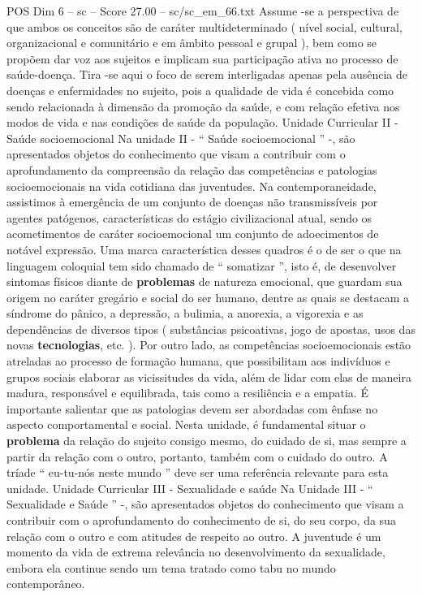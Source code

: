 \begin{textsample}{POS Dim 6 – sc – Score 27.00 – sc/sc\_em\_66.txt}
Assume -se a perspectiva de que ambos os conceitos são de caráter multideterminado ( nível social, cultural, organizacional e comunitário e em âmbito pessoal e grupal ), bem como se propõem dar voz aos sujeitos e implicam sua participação ativa no processo de saúde-doença.
Tira -se aqui o foco de serem interligadas apenas pela ausência de doenças e enfermidades no sujeito, pois a qualidade de vida é concebida como sendo relacionada à dimensão da promoção da saúde, e com relação efetiva nos modos de vida e nas condições de saúde da população.
Unidade Curricular II - Saúde socioemocional Na unidade II - “ Saúde socioemocional ” -, são apresentados objetos do conhecimento que visam a contribuir com o aprofundamento da compreensão da relação das competências e patologias socioemocionais na vida cotidiana das juventudes.
Na contemporaneidade, assistimos à emergência de um conjunto de doenças não transmissíveis por agentes patógenos, características do estágio civilizacional atual, sendo os acometimentos de caráter socioemocional um conjunto de adoecimentos de notável expressão.
Uma marca característica desses quadros é o de ser o que na linguagem coloquial tem sido chamado de “ somatizar ”, isto é, de desenvolver sintomas físicos diante de \textbf{problemas} de natureza emocional, que guardam sua origem no caráter gregário e social do ser humano, dentre as quais se destacam a síndrome do pânico, a depressão, a bulimia, a anorexia, a vigorexia e as dependências de diversos tipos ( substâncias psicoativas, jogo de apostas, usos das novas \textbf{tecnologias}, etc. ).
Por outro lado, as competências socioemocionais estão atreladas ao processo de formação humana, que possibilitam aos indivíduos e grupos sociais elaborar as vicissitudes da vida, além de lidar com elas de maneira madura, responsável e equilibrada, tais como a resiliência e a empatia.
É importante salientar que as patologias devem ser abordadas com ênfase no aspecto comportamental e social.
Nesta unidade, é fundamental situar o \textbf{problema} da relação do sujeito consigo mesmo, do cuidado de si, mas sempre a partir da relação com o outro, portanto, também com o cuidado do outro.
A tríade “ eu-tu-nós neste mundo ” deve ser uma referência relevante para esta unidade.
Unidade Curricular III - Sexualidade e saúde Na Unidade III - “ Sexualidade e Saúde ” -, são apresentados objetos do conhecimento que visam a contribuir com o aprofundamento do conhecimento de si, do seu corpo, da sua relação com o outro e com atitudes de respeito ao outro.
A juventude é um momento da vida de extrema relevância no desenvolvimento da sexualidade, embora ela continue sendo um tema tratado como tabu no mundo contemporâneo.

\end{textsample}
